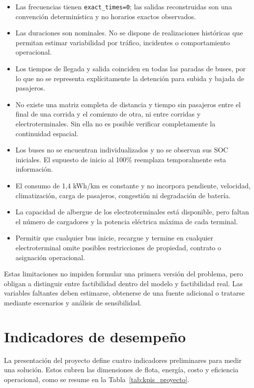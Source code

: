 \begin{itemize}
 \item Las frecuencias tienen \texttt{exact\_times=0}; las salidas reconstruidas
 son una convención determinística y no horarios exactos observados.
 \item Las duraciones son nominales. No se dispone de realizaciones históricas
 que permitan estimar variabilidad por tráfico, incidentes o comportamiento
 operacional.
 \item Los tiempos de llegada y salida coinciden en todas las paradas de buses,
 por lo que no se representa explícitamente la detención para subida y bajada de
 pasajeros.
 \item No existe una matriz completa de distancia y tiempo sin pasajeros entre
 el final de una corrida y el comienzo de otra, ni entre corridas y
 electroterminales. Sin ella no es posible verificar completamente la
 continuidad espacial.
 \item Los buses no se encuentran individualizados y no se observan sus SOC
 iniciales. El supuesto de inicio al 100\% reemplaza temporalmente esta
 información.
 \item El consumo de 1,4 kWh/km es constante y no incorpora pendiente, velocidad,
 climatización, carga de pasajeros, congestión ni degradación de batería.
 \item La capacidad de albergue de los electroterminales está disponible, pero
 faltan el número de cargadores y la potencia eléctrica máxima de cada terminal.
 \item Permitir que cualquier bus inicie, recargue y termine en cualquier
 electroterminal omite posibles restricciones de propiedad, contrato o
 asignación operacional.
\end{itemize}

Estas limitaciones no impiden formular una primera versión del problema, pero
obligan a distinguir entre factibilidad dentro del modelo y factibilidad real.
Las variables faltantes deben estimarse, obtenerse de una fuente adicional o
tratarse mediante escenarios y análisis de sensibilidad.

\section{Indicadores de desempeño}

La presentación del proyecto define cuatro indicadores preliminares para medir
una solución. Estos cubren las dimensiones de flota, energía, costo y eficiencia
operacional, como se resume en la Tabla~\ref{tab:kpis_proyecto}.

